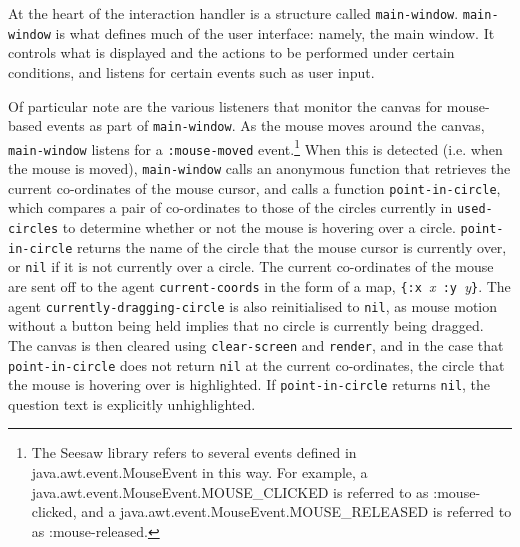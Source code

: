 \documentclass[12pt,twoside,notitlepage,xetex]{report}
\begin{document}

At the heart of the interaction handler is a structure called
\verb¬main-window¬.  \verb¬main-window¬ is what defines much of the user
interface: namely, the main window.  It controls what is displayed and the
actions to be performed under certain conditions, and listens for certain
events such as user input.



Of particular note are the various listeners that monitor the canvas for mouse-
based events as part of \verb¬main-window¬.  As the mouse moves around the
canvas, \verb¬main-window¬ listens for a \verb¬:mouse-moved¬
event.\footnote{The Seesaw library refers to several events defined in
{\ttfamily java.awt.event.MouseEvent} in this way.  For example, a
{\ttfamily java.awt.event.MouseEvent.MOUSE\_CLICKED} is referred to as
{\ttfamily :mouse-clicked}, and a
{\ttfamily java.awt.event.MouseEvent.MOUSE\_RELEASED} is referred to as
{\ttfamily :mouse-released}.}  When this is detected (i.e. when the mouse is
moved), \verb¬main-window¬ calls an anonymous function that retrieves the
current co-ordinates of the mouse cursor, and calls a function
\verb¬point-in-circle¬, which compares a pair of co-ordinates to those of the
circles currently in \verb¬used-circles¬ to determine whether or not the mouse
is hovering over a circle.  \verb¬point-in-circle¬ returns the name of the
circle that the mouse cursor is currently over, or \verb¬nil¬ if it is not
currently over a circle.  The current co-ordinates of the mouse are sent off to
the agent \verb¬current-coords¬ in the form of a map,
\verb¬{:x ¬\emph{x}\verb¬ :y ¬\emph{y}\verb¬}¬.  The agent
\verb¬currently-dragging-circle¬ is also reinitialised to \verb¬nil¬, as mouse
motion without a button being held implies that no circle is currently being
dragged.  The canvas is then cleared using \verb¬clear-screen¬ and
\verb¬render¬, and in the case that \verb¬point-in-circle¬ does not return
\verb¬nil¬ at the current co-ordinates, the circle that the mouse is hovering
over is highlighted.  If \verb¬point-in-circle¬ returns \verb¬nil¬, the
question text is explicitly unhighlighted.
\end{document}
